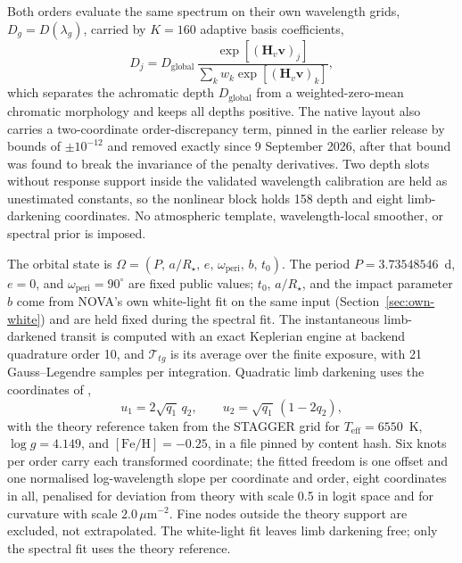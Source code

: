 
Both orders evaluate the same spectrum on their own wavelength grids,
$D_g=D(\lambda_g)$, carried by $K=160$ adaptive basis coefficients,
\begin{equation}
  D_j = D_{\mathrm{global}}\,
  \frac{\exp\!\left[(\bm{H}_v\bm{v})_j\right]}
       {\sum_k w_k \exp\!\left[(\bm{H}_v\bm{v})_k\right]} ,
  \label{eq:depth-basis}
\end{equation}
which separates the achromatic depth $D_{\mathrm{global}}$ from a
weighted-zero-mean chromatic morphology and keeps all depths positive.
The native layout also carries a two-coordinate order-discrepancy term,
pinned in the earlier release by bounds of $\pm10^{-12}$ and removed
exactly since 9 September 2026, after that bound was found to break the
invariance of the penalty derivatives. Two depth slots without response
support inside the validated wavelength calibration are held as
unestimated constants, so the nonlinear block holds 158 depth and eight
limb-darkening coordinates. No atmospheric template, wavelength-local
smoother, or spectral prior is imposed.

The orbital state is
$\Omega=(P,\,a/R_\star,\,e,\,\omega_{\mathrm{peri}},\,b,\,t_0)$. The
period $P=3.73548546$~d, $e=0$, and $\omega_{\mathrm{peri}}=90^\circ$
are fixed public values; $t_0$, $a/R_\star$, and the impact parameter
$b$ come from NOVA's own white-light fit on the same input
(Section~\ref{sec:own-white}) and are held fixed during the spectral fit.
The instantaneous limb-darkened transit is computed with an exact
Keplerian engine \citep{Jaxoplanet2025} at backend quadrature order 10,
and $\mathcal{T}_{tg}$ is its average over the finite exposure, with 21
Gauss--Legendre samples per integration. Quadratic limb darkening
\citep{MandelAgol2002} uses the coordinates of \citet{Kipping2013},
\begin{equation}
 u_1=2\sqrt{q_1}\,q_2, \qquad
 u_2=\sqrt{q_1}\,(1-2q_2),
 \label{eq:kipping-coordinates}
\end{equation}
with the theory reference taken from the STAGGER grid
\citep{MagicEtAl2015} for $T_{\mathrm{eff}}=6550$~K, $\log g=4.149$, and
$[\mathrm{Fe}/\mathrm{H}]=-0.25$, in a file pinned by content hash. Six
knots per order carry each transformed coordinate; the fitted freedom is
one offset and one normalised log-wavelength slope per coordinate and
order, eight coordinates in all, penalised for deviation from theory with
scale 0.5 in logit space and for curvature with scale
$2.0\,\mu\mathrm{m}^{-2}$. Fine nodes outside the theory support are
excluded, not extrapolated. The white-light fit leaves limb darkening
free; only the spectral fit uses the theory reference.

